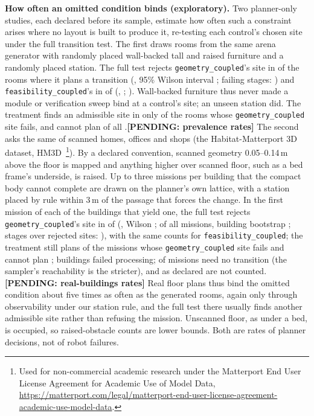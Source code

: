 \documentclass[conference]{IEEEtran}
\newcommand{\pending}[1]{\textbf{[PENDING: #1]}}
\newcommand{\method}[1]{\texttt{#1}}
\newcommand{\withprevalence}[2]{\ifdefined\prevLayouts #1\else #2\fi}
\newcommand{\withreal}[2]{\ifdefined\realBuildings #1\else #2\fi}
\begin{document}
\textbf{How often an omitted condition binds (exploratory).} Two planner-only studies, each declared before its sample, estimate how often such a constraint arises where no layout is built to produce it, re-testing each control's chosen site under the full transition test. The first draws \withprevalence{\prevLayouts}{300} rooms from the same arena generator with randomly placed wall-backed tall and raised furniture and a randomly placed station. \withprevalence{The full test rejects \method{geometry\_coupled}'s site in \prevGeomRejected{} of the \prevGeomSited{} rooms where it plans a transition (\prevGeomPct, 95\% Wilson interval \prevGeomCI; failing stages: \prevGeomStages) and \method{feasibility\_coupled}'s in \prevFeasRejected{} of \prevFeasSited{} (\prevFeasPct, \prevFeasCI; \prevFeasStages). Wall-backed furniture thus never made a module or verification sweep bind at a control's site; an unseen station did. The treatment finds an admissible site in only \prevGeomTreatPlans{} of the \prevGeomRejected{} rooms whose \method{geometry\_coupled} site fails, and cannot plan \prevTreatUnplanned{} of all \prevLayouts.}{\pending{prevalence rates}} The second asks the same of \withreal{\realBuildings}{900} scanned homes, offices and shops (the Habitat-Matterport 3D dataset, HM3D~\cite{ramakrishnan2021hm3d}\footnote{Used for non-commercial academic research under the Matterport End User License Agreement for Academic Use of Model Data, \url{https://matterport.com/legal/matterport-end-user-license-agreement-academic-use-model-data}.}). By a declared convention, scanned geometry 0.05--0.14\,m above the floor is mapped and anything higher over scanned floor, such as a bed frame's underside, is raised. Up to three missions per building that the compact body cannot complete are drawn on the planner's own lattice, with a station placed by rule within 3\,m of the passage that forces the change. \withreal{In the first mission of each of the \realWithMission{} buildings that yield one, the full test rejects \method{geometry\_coupled}'s site in \realGeomFirstRejected{} of \realGeomFirstSited{} (\realGeomFirstPct, Wilson \realGeomFirstCI; \realGeomAllPct{} of all \realGeomAllSited{} missions, building bootstrap \realGeomAllCI; stages over rejected sites: \realGeomStages), with the same counts for \method{feasibility\_coupled}; the treatment still plans \realGeomTreatPlans{} of the missions whose \method{geometry\_coupled} site fails and cannot plan \realTreatUnplanned{}; \realErrors{} buildings failed processing; \realNoTransition{} of \realMissions{} missions need no transition (the sampler's reachability is the stricter), and as declared are not counted.}{\pending{real-buildings rates}} Real floor plans thus bind the omitted condition about five times as often as the generated rooms, again only through observability under our station rule, and the full test there usually finds another admissible site rather than refusing the mission. Unscanned floor, as under a bed, is occupied, so raised-obstacle counts are lower bounds. Both are rates of planner decisions, not of robot failures.
\end{document}
